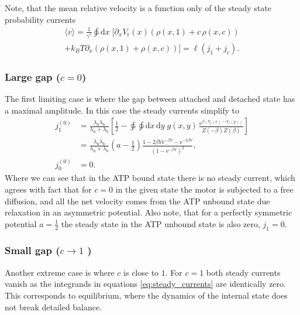 \documentclass[aps,pre,twocolumn,showpacs,showkeys,superscriptaddress,floatfix]{revtex4-1}
\newcommand{\rmd}{{\mathrm d}}
\newcommand{\rme}{{\mathrm e}}
\begin{document}
Note, that the mean relative velocity is a function only of the steady state probability currents
\begin{multline*}
\langle v \rangle = 
\frac{1}{\gamma^*} \ointctrclockwise \rmd x \; \bigl[ \partial_x V_\text{r}(x) \left( \rho(x,1) + c \, \rho(x,c) \right) \\
+ k_B T \partial_x \left( \rho(x,1) + \rho(x,c) \right) \bigr] 
= 
\ell ( j_1 + j_c ) . 
\end{multline*} 

\subsubsection{Large gap ($c = 0$)}
The first limiting case is where the gap between attached and detached state has a maximal amplitude. 
In this case the steady currents simplify to  
\begin{align*}
j_1^{(0)} &= \frac{ \lambda_\text{u} \lambda_\text{b} }{ \lambda_\text{u} + \lambda_\text{b} } \left[ \frac{1}{2} -  
\ointctrclockwise \ointctrclockwise \rmd x \, \rmd y \; g(x,y) \, \frac{ \rme^{ \beta ( V_\text{r}(x) - V_\text{r}(y) ) } }{ Z( - \beta ) Z(\beta) } \right] \\
&= \frac{ \lambda_\text{u} \lambda_\text{b} }{ \lambda_\text{u} + \lambda_\text{b} } \left( a - \frac{1}{2} \right) \frac{ 1 - 2 \beta V \rme^{-\beta V } - \rme^{-2 \beta V} }{ \left( 1 - \rme^{-\beta V} \right)^2 } ,
\\
j_0^{(0)} &= 0 .  
\end{align*}
Where we can see that in the ATP bound state there is no steady current, which agrees with fact that for $c=0$ in the given state the motor is subjected to a free diffusion,
and all the net velocity comes from the ATP unbound state due relaxation in an asymmetric potential. 
Also note, that for a perfectly symmetric potential $a = \frac{1}{2}$ the steady state in the ATP unbound state is also zero, $j_1 = 0$. 

\subsubsection{Small gap ($ c \to 1 $ ) }
Another extreme case is where $c$ is close to $1$. 
For $c=1$ both steady currents vanish as the integrands in equations \eqref{eq:steady_currents} are identically zero.
This corresponds to equilibrium, where the dynamics of the internal state does not break detailed balance. 
\end{document}
